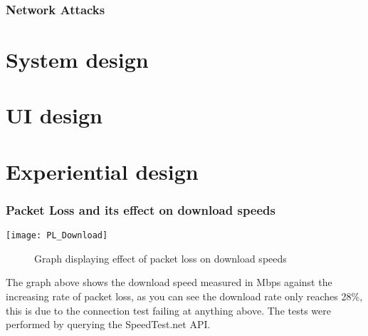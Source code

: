 \subsubsection{Network Attacks}




\section{System design}



\section{UI design}



\section{Experiential design}

\subsubsection{Packet Loss and its effect on download speeds}

\begin{center}
	\texttt{[image: PL\_Download]}
	\begin{figure}[h]
	 	\caption{Graph displaying effect of packet loss on download speeds}
	\end{figure}		
\end{center}

The graph above shows the download speed measured in Mbps against the increasing rate of packet loss, as you can see the download rate only reaches 28\%, this is due to the connection test failing at anything above. The tests were performed by querying the SpeedTest.net  API. 

